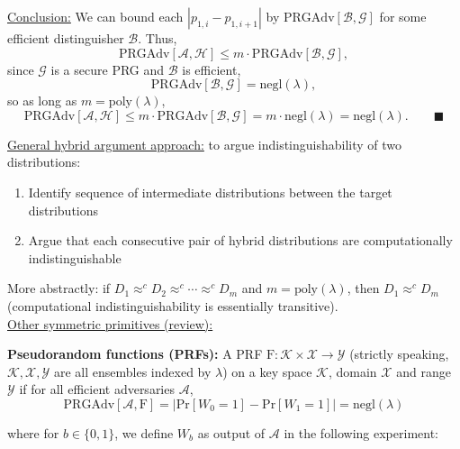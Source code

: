 \documentclass{article}
\begin{document}
\noindent \underline{Conclusion:} We can bound each $\left| p_{1,i} - p_{1,i+1} \right|$ by $\mathrm{PRGAdv}[\mathcal{B},\mathcal{G}]$ for some efficient distinguisher $\mathcal{B}$. Thus, 
\begin{equation*}
    \mathrm{PRGAdv}[\mathcal{A},\mathcal{H}] \leq m \cdot \mathrm{PRGAdv}[\mathcal{B},\mathcal{G}],
\end{equation*}
since $\mathcal{G}$ is a secure PRG and $\mathcal{B}$ is efficient, 
\begin{equation*}
\mathrm{PRGAdv}[\mathcal{B},\mathcal{G}] = \mathrm{negl}(\lambda),
\end{equation*}
so as long as $m = \mathrm{poly}(\lambda)$, 
\begin{equation*}
\mathrm{PRGAdv}[\mathcal{A},\mathcal{H}] \leq m \cdot \mathrm{PRGAdv}[\mathcal{B},\mathcal{G}] = m \cdot \mathrm{negl}(\lambda) = \mathrm{negl}(\lambda). \qquad \blacksquare
\end{equation*}

\noindent \underline{General hybrid argument approach:} to argue indistinguishability of two distributions: 
\begin{enumerate}
    \item Identify sequence of intermediate distributions between the target distributions
    \item Argue that each consecutive pair of hybrid distributions are computationally indistinguishable
\end{enumerate}

More abstractly: 
if $D_1 {\approx}^{c} D_2 {\approx}^{c} \cdots {\approx}^{c} D_m$ and $m = \mathrm{poly}(\lambda)$, then $D_1 {\approx}^{c} D_m$ (computational indistinguishability is essentially transitive).
\\

\noindent \underline{Other symmetric primitives (review):}

\textbf{Pseudorandom functions (PRFs):} A PRF $\mathrm{F}: \mathcal{K} \times \mathcal{X} \rightarrow \mathcal{Y}$ (strictly speaking, $\mathcal{K},\mathcal{X},\mathcal{Y}$ are all ensembles indexed by $\lambda$) on a key space $\mathcal{K}$, domain $\mathcal{X}$ and range $\mathcal{Y}$ if for all efficient adversaries $\mathcal{A}$, 
\begin{equation*}
    \mathrm{PRGAdv}[\mathcal{A},\mathrm{F}] = \left| \mathrm{Pr}[W_0=1] - \mathrm{Pr}[W_1=1] \right| = \mathrm{negl}(\lambda)
\end{equation*}

where for $b \in \{ 0,1 \}$, we define $W_b$ as output of $\mathcal{A}$ in the following experiment:
\end{document}
